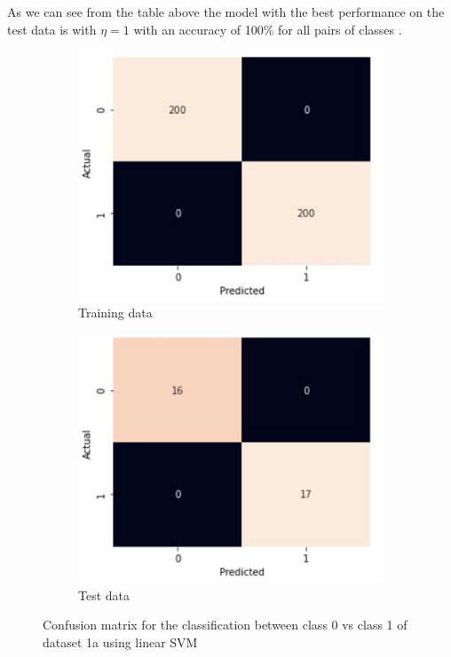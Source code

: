 \documentclass[11pt]{article}
\begin{document}
As we can see from the table above the model with the best performance on the test data is with  $\eta =1$ with an accuracy of 100\% for all pairs of classes .
\begin{figure}[h]
\centering
	\begin{subfigure}[b]{0.45\textwidth}
	\centering
	\includegraphics[scale=0.45]{dataset1a_linear_svm_01_cm_train.jpg}
	\caption{Training data}
	\label{fig:fig1.3.1.1}
	\end{subfigure}
	\begin{subfigure}[b]{0.45\textwidth}
	\centering
	\includegraphics[scale=0.45]{dataset1a_linear_svm_01_cm_test.jpg}
	\caption{Test data}
	\label{fig:fig1.3.1.2}
	\end{subfigure}
\caption{Confusion matrix for the classification between class 0 vs class 1 of dataset 1a using linear SVM}
\label{fig:fig1.3.1}
\end{figure}
\end{document}
